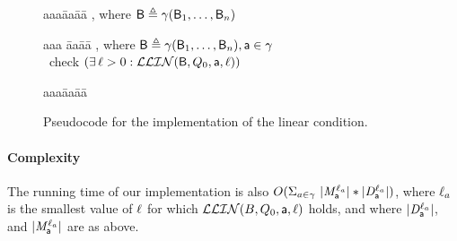 \begin{figure}[H]
\setcounter{lctr}{0}
\begin{tabbing}\label{alg:check-df}
aaa\= aa\= aa\= \kill
{},  where $\mathsf{B} \triangleq \gamma(\mathsf{B}_1,\dots,\mathsf{B}_n)$\\
\lio{\ENDFOR;}
\end{tabbing}

\setcounter{lctr}{0}
\begin{tabbing}\label{alg:checkInt}
aaa \= aa\= aa\= \kill
{},  where $\mathsf{B} \triangleq \gamma(\mathsf{B}_1,\dots,\mathsf{B}_n), \mathsf{a} \in \gamma$\\
\cmnt\ check $(\exists\, \ell > 0: \mathcal{LLIN}(\mathsf{B}, Q_0, \mathsf{a}, \ell))$\\
\lio{\WHILEC{\ttt}}
\lio{\ENDWHILE}
\end{tabbing}

\setcounter{lctr}{0}
\begin{tabbing}
\label{alg:eval-ldfc}
aaa\= aa\= aa\= \kill
{}\\
  \lit{\FI}
\lio{\ENDFOR;}
\end{tabbing}

\caption{Pseudocode for the implementation of the linear condition.}
\label{fig:implementation}
\label{fig:implementation-checkDF}
\end{figure}

\paragraph{Complexity} The running  time of our implementation is
also 
$O(\Sigma_{a \in \gamma}\ |\mathit{M}_{\mathsf{a}}^{\ell_a}| * |\mathit{D}_{\mathsf{a}}^{\ell_a}|)$,
where $\ell_a$ is the smallest value of $\ell$ for which $\mathcal{LLIN}(B, Q_0, \mathsf{a}, \ell)$ holds, and where
$|\mathit{D}_{\mathsf{a}}^{\ell_a}|$, and $|\mathit{M}_{\mathsf{a}}^{\ell_a}|$ are as above.
